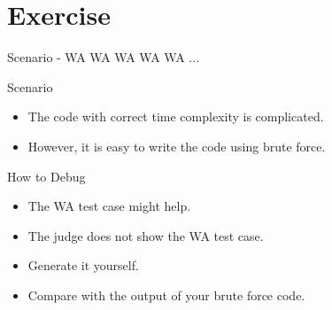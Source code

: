 \section{Exercise}

\begin{frame}{Scenario - WA WA WA WA WA ...}
\begin{center}
\end{center}
\end{frame}

\begin{frame}{Scenario}
\begin{itemize}
\item The code with correct time complexity is complicated.
\item However, it is easy to write the code using brute force.
\end{itemize}
\end{frame}

\begin{frame}{How to Debug}
\begin{itemize}
\item The WA test case might help.
\item The judge does not show the WA test case.
\item Generate it yourself.
\item Compare with the output of your brute force code.
\end{itemize}
\end{frame}

